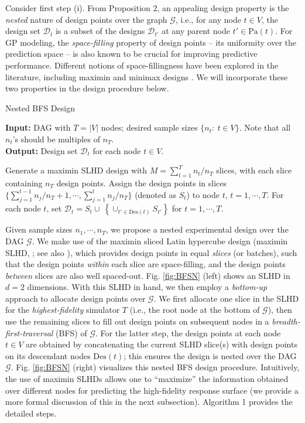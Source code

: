 \documentclass[12pt]{article}
\begin{document}
Consider first step (i). From Proposition 2, an appealing design property is the \textit{nested} nature of design points over the graph $\mathcal{G}$, i.e., for any node $t \in V$, the design set $\mathcal{D}_t$ is a subset of the designs $\mathcal{D}_{t'}$ at any parent node $t' \in \text{Pa}(t)$. For GP modeling, the \textit{space-filling} property of design points \citep{santner2019design} -- its uniformity over the prediction space -- is also known to be crucial for improving predictive performance. Different notions of space-fillingness have been explored in the literature, including maximin \citep{johnson1990minimax,morris1995exploratory} and minimax designs \citep{johnson1990minimax,mak2018minimax}. We will incorporate these two properties in the design procedure below.

\begin{algorithm}[!t]
\caption{Nested BFS Design}\label{alg:DAGE}
\textbf{Input:} DAG with $T=|V|$ nodes; desired sample sizes $\{n_t:\ t\in V\}$. Note that all $n_t$'s should be multiples of $n_T$.\\
\textbf{Output:} Design set $\mathcal{D}_t$ for each node $t \in V$.
\begin{algorithmic}[1]
    \State Generate a maximin SLHD design \citep{Ba2015SLHD} with $M=\sum_{t=1}^T{n_t}/{n_T}$ slices, with each slice containing $n_T$ design points.
    \State Assign the design points in slices $\{\sum_{j=1}^{t-1}{n_j}/{n_T}+1,\cdots,\sum_{j=1}^{t}{n_j}/{n_T}\}$ (denoted as $S_t$) to node $t$, $t = 1, \cdots, T$.
    \State For each node $t$, set $\mathcal{D}_t=S_t \cup\ 
    \left\{\cup_{t'\in \text{Des}(t)}S_{t'}\right\}$ for  $t=1,\cdots,T$.
\end{algorithmic}
\end{algorithm}

Given sample sizes $n_1, \cdots, n_T$, we propose a nested experimental design over the DAG $\mathcal{G}$. We make use of the maximin sliced Latin hypercube design (maximin SLHD, \citealp{Ba2015SLHD}; see also \citealp{qian2012sliced}), which provides design points in equal \textit{slices} (or batches), such that the design points \textit{within} each slice are space-filling, and the design points \textit{between} slices are also well spaced-out. Fig. \ref{fig:BFSN} (left) shows an SLHD in $d=2$ dimensions. With this SLHD in hand, we then employ a \textit{bottom-up} approach to allocate design points over $\mathcal{G}$. We first allocate one slice in the SLHD for the \textit{highest-fidelity} simulator $T$ (i.e., the root node at the bottom of $\mathcal{G}$), then use the remaining slices to fill out design points on subsequent nodes in a \textit{breadth-first-traversal} (BFS) of $\mathcal{G}$. For the latter step, the design points at each node $t \in V$ are obtained by concatenating the current SLHD slice(s) with design points on its descendant nodes $\text{Des}(t)$; this ensures the design is nested over the DAG $\mathcal{G}$. Fig. \ref{fig:BFSN} (right) visualizes this nested BFS design procedure. Intuitively, the use of maximin SLHDs allows one to ``maximize'' the information obtained over different nodes for predicting the high-fidelity response surface (we provide a more formal discussion of this in the next subsection). Algorithm 1 provides the detailed steps.
\end{document}
